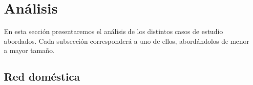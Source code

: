 \section{Análisis}

En esta sección presentaremos el análisis de los distintos casos de estudio abordados. Cada subsección corresponderá a uno de ellos, abordándolos de menor a mayor tamaño.

\subsection{Red doméstica}








